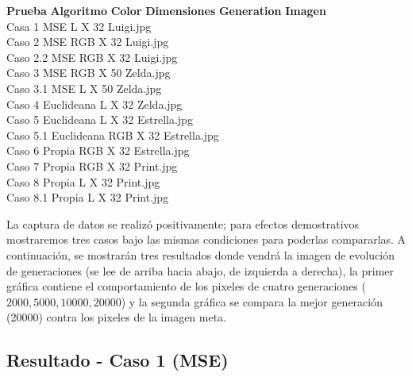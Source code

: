 \documentclass[letterpaper, 10 pt, conference]{ieeeconf}  %
\begin{document}
\begin{tabbing}
\textbf{Prueba} \=	\textbf{Algoritmo} \=	\textbf{Color}	 \=\textbf{Dimensiones}	 \=\textbf{Generation}	 \=\textbf{Imagen}\\
Casa 1 \>	MSE\>	L	 X 32		\>Luigi.jpg\\
Caso 2 \>	MSE\>	RGB	 X 32	\>Luigi.jpg\\
Caso 2.2\>	MSE	\>RGB	 X 32	\>Luigi.jpg\\
Caso 3	\>MSE	\>RGB	 X 50		\>Zelda.jpg\\
Caso 3.1\>	MSE\>	L	 X 50	\>Zelda.jpg\\
Caso 4	\>Euclideana\>	L X 32\>	Zelda.jpg\\
Caso 5	\>Euclideana\>	L X 32		\>Estrella.jpg\\
Caso 5.1\>	Euclideana\>	RGB	 X 32	\>Estrella.jpg\\
Caso 6	\>Propia\>	RGB X 32		\>Estrella.jpg\\
Caso 7	\>Propia\>	RGB X 32	\>Print.jpg\\
Caso 8	\>Propia\>	L X 32\>	Print.jpg\\
Caso 8.1 \>	Propia	\>L X 32\>	Print.jpg\\
\end{tabbing}

\indent La captura de datos se realiz\'o positivamente; para efectos demostrativos mostraremos tres casos bajo las mismas condiciones para poderlas compararlas. A continuaci\'on, se mostrar\'an tres resultados donde vendr\'a la imagen de evoluci\'on de generaciones (se lee de arriba hacia abajo, de izquierda a derecha), la primer gr\'afica contiene el comportamiento de los pixeles de cuatro generaciones ($2000,5000,10000,20000$) y la segunda gr\'afica se compara la mejor generaci\'on (20000) contra los pixeles de la imagen meta.\\


\subsection{\textbf{Resultado - Caso 1 (MSE)}}
\end{document}
